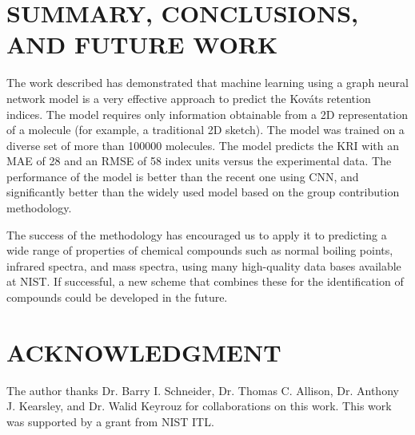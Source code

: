 \documentclass{IEEEcsmag}
\newcommand*{\kovats}{Kov\'ats\xspace}
\begin{document}
\section{SUMMARY, CONCLUSIONS, AND FUTURE WORK}

The work described has demonstrated that machine learning using a graph neural network model is a very effective approach to predict the \kovats retention indices. The model requires only information obtainable from a 2D representation of a molecule (for example, a traditional 2D sketch). The model was trained on a diverse set of more than 100000 molecules. The model predicts the KRI with an MAE of 28 and an RMSE of 58 index units versus the experimental data. The performance of the model is better than the recent one using CNN,\cite{2019Matyushin} and significantly better than the widely used model based on the group contribution methodology.\cite{2007Stein}

The success of the methodology has encouraged us to apply it to predicting a wide range of properties of chemical compounds such as normal boiling points, infrared spectra, and mass spectra, using many high-quality data bases available at NIST. If successful, a new scheme that combines these for the identification of compounds could be developed in the future.


\section{ACKNOWLEDGMENT}

The author thanks Dr. Barry I. Schneider, Dr. Thomas C. Allison, Dr. Anthony J. Kearsley, and Dr. Walid Keyrouz for collaborations on this work. This work was supported by a grant from NIST ITL.%
\end{document}

